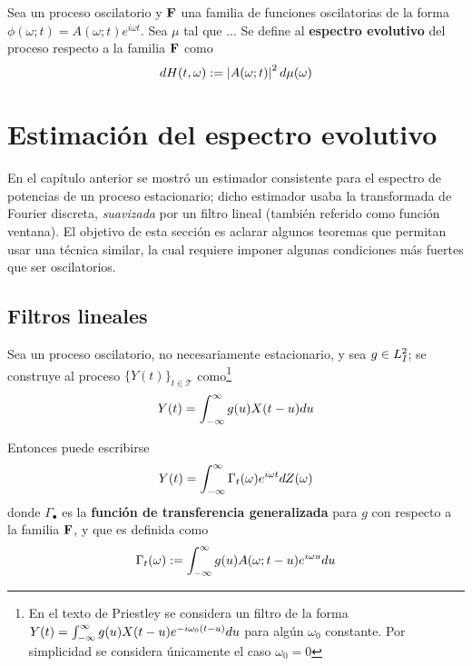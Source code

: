 \begin{definicion}
Sea \xt un proceso oscilatorio y $\mathbf{F}$ una familia de funciones oscilatorias de la forma
$\phi(\omega;t) = A(\omega;t) e^{i \omega t}$. 
Sea $\mu$ tal que ...
Se define al \textbf{espectro evolutivo} del proceso respecto a la familia $\mathbf{F}$ como
\begin{equation}
dH(t,\omega) := \left| A(\omega;t) \right|^{2} d\mu(\omega)
\end{equation}
\label{def:oscilatorio}
\end{definicion}


\section{Estimación del espectro evolutivo}
\label{sec:estimacion}

En el capítulo anterior se mostró un estimador consistente para el espectro de potencias de un proceso estacionario; dicho estimador usaba la transformada de Fourier discreta, \textit{suavizada} por un filtro lineal (también referido como función ventana).
%
El objetivo de esta sección es aclarar algunos teoremas que permitan usar una técnica similar, la cual requiere imponer algunas condiciones más fuertes que ser oscilatorios.

\subsection{Filtros lineales}

Sea \xt un proceso oscilatorio, no necesariamente estacionario, y sea $g\in L^{2}_I$; se construye al proceso $\{Y(t)\}_{t\in \mathcal{T}}$ como\footnote{En el texto de Priestley se considera un filtro de la forma $Y(t) = \int_{-\infty}^{\infty} g(u) X(t-u) e^{-i \omega_0 (t-u)} du$ para algún $\omega_0$ constante. 
Por simplicidad se considera únicamente el caso $\omega_0=0$}
\begin{equation}
Y(t) = \int_{-\infty}^{\infty} g(u) X(t-u) du
\end{equation}

Entonces puede escribirse 
\begin{equation}
Y(t) = \int_{-\infty}^{\infty} \Gamma_t(\omega) e^{i \omega t} dZ(\omega) 
\label{se6:filtrado}
\end{equation}
donde $\Gamma_\bullet$ es la \textbf{función de transferencia generalizada} para $g$ con respecto a la familia $\mathbf{F}$, y que es definida como
\begin{equation}
\Gamma_t (\omega) := \int_{-\infty}^{\infty} g(u) A(\omega; t-u) e^{i \omega u} du
\label{se6:trans_general}
\end{equation}

